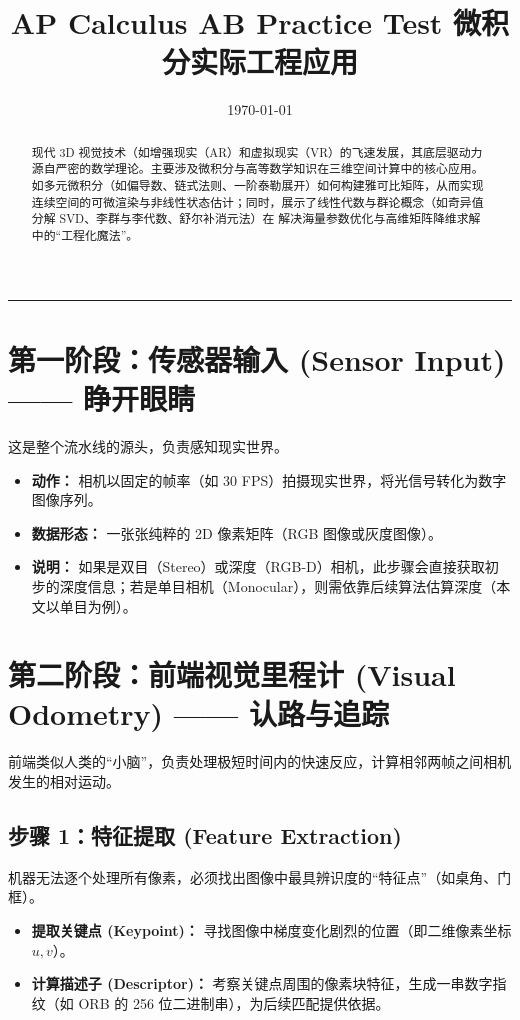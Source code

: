 \documentclass[12pt,a4paper]{article}
\title{\textbf{AP Calculus AB Practice Test }}
\date{\today}
\title{\textbf{微积分实际工程应用}}
\date{}
\begin{document}
\maketitle
\begin{abstract}
现代 3D 视觉技术（如增强现实（AR）和虚拟现实（VR）的飞速发展，其底层驱动力源自严密的数学理论。主要涉及微积分与高等数学知识在三维空间计算中的核心应用。
如多元微积分（如偏导数、链式法则、一阶泰勒展开）如何构建雅可比矩阵，从而实现连续空间的可微渲染与非线性状态估计；同时，展示了线性代数与群论概念（如奇异值分解 SVD、李群与李代数、舒尔补消元法）在
解决海量参数优化与高维矩阵降维求解中的“工程化魔法”。
\end{abstract}


\vspace{0.5cm}
\hrule
\vspace{0.5cm}

\section{第一阶段：传感器输入 (Sensor Input) —— 睁开眼睛}
这是整个流水线的源头，负责感知现实世界。
\begin{itemize}
    \item \textbf{动作：} 相机以固定的帧率（如 30 FPS）拍摄现实世界，将光信号转化为数字图像序列。
    \item \textbf{数据形态：} 一张张纯粹的 2D 像素矩阵（RGB 图像或灰度图像）。
    \item \textbf{说明：} 如果是双目（Stereo）或深度（RGB-D）相机，此步骤会直接获取初步的深度信息；若是单目相机（Monocular），则需依靠后续算法估算深度（本文以单目为例）。
\end{itemize}

\section{第二阶段：前端视觉里程计 (Visual Odometry) —— 认路与追踪}
前端类似人类的“小脑”，负责处理极短时间内的快速反应，计算相邻两帧之间相机发生的相对运动。

\subsection{步骤 1：特征提取 (Feature Extraction)}
机器无法逐个处理所有像素，必须找出图像中最具辨识度的“特征点”（如桌角、门框）。
\begin{itemize}
    \item \textbf{提取关键点 (Keypoint)：} 寻找图像中梯度变化剧烈的位置（即二维像素坐标 $u, v$）。
    \item \textbf{计算描述子 (Descriptor)：} 考察关键点周围的像素块特征，生成一串数字指纹（如 ORB 的 256 位二进制串），为后续匹配提供依据。
\end{itemize}
\end{document}
